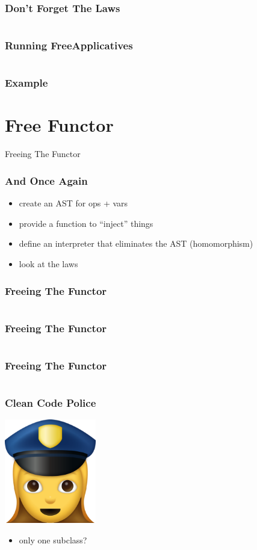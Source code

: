 \documentclass{beamer}
\newcommand{\recipe}{%
  \begin{itemize}
  \item create an AST for ops + vars
  \item provide a function to ``inject'' things
  \item define an interpreter that eliminates the AST (homomorphism)
  \item look at the laws
  \end{itemize}
}
\begin{document}
\begin{frame}
  \frametitle{Don't Forget The Laws}
  \inputminted{scala}{snippets/opt-free-ap-instance.scala}
\end{frame}

\begin{frame}
  \frametitle{Running FreeApplicatives}
  \inputminted{scala}{snippets/freeap-interp.scala}
\end{frame}

\begin{frame}
  \frametitle{Example}
\end{frame}

\section{Free Functor}\label{sec:free-functor}
\begin{frame}
  \begin{center}
    \Huge
    Freeing The Functor
  \end{center}
\end{frame}

\begin{frame}[fragile]
  \frametitle{And Once Again}
  \recipe{}
\end{frame}

\begin{frame}[fragile]
  \frametitle{Freeing The Functor}
  \inputminted{scala}{snippets/functor-typeclass.scala}
\end{frame}

\begin{frame}[fragile]
  \frametitle{Freeing The Functor}
  \inputminted{scala}{snippets/free-functor1.scala}
\end{frame}

\begin{frame}[fragile]
  \frametitle{Freeing The Functor}
  \inputminted{scala}{snippets/free-functor2.scala}
\end{frame}

\begin{frame}[fragile]
  \frametitle{Clean Code Police}
  \begin{center}
    \includegraphics[width=0.3\textwidth]{static-images/police.png}
  \end{center}
  \begin{itemize}
  \item only one subclass?
  \end{itemize}
\end{frame}
\end{document}
